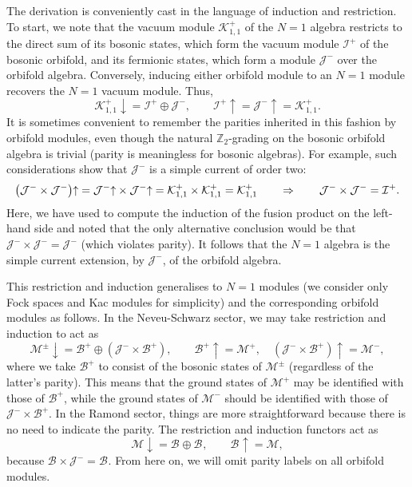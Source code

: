 \documentclass[a4paper,reqno,12pt]{report}
\theoremstyle{definition}
\numberwithin{equation}{section}
\let\originalleft\left     %
\let\originalright\right
\renewcommand{\left}{\mathopen{}\mathclose\bgroup\originalleft}
\renewcommand{\right}{\aftergroup\egroup\originalright}
\newcommand{\brac}[1]{\left( #1 \right)}
\newcommand{\ZZ}{\mathbb{Z}}
\newcommand{\Ra}{\Rightarrow}
\newcommand{\Kac}[1]{\mathcal{K}_{#1}}       %
\newcommand{\fuse}{\mathbin{\times}}                                            %
\newcommand{\lhs}{left-hand side}
\newcommand{\ns}{Neveu-Schwarz}
\theoremstyle{plain}
\newcommand{\Mod}[1]{\mathcal{#1}}                 %
\newcommand{\Res}[1]{#1 {\downarrow}} %
\newcommand{\Ind}[1]{#1 {\uparrow}}   %
\newcommand{\Orb}[1]{\Mod{B}_{#1}}                 %
\begin{document}
The derivation is conveniently cast in the language of induction and restriction.  To start, we note that the vacuum module $\Kac{1,1}^+$ of the $N=1$ algebra restricts to the direct sum of its bosonic states, which form the vacuum module $\Mod{I}^+$ of the bosonic orbifold, and its fermionic states, which form a module $\Mod{J}^-$ over the orbifold algebra.  Conversely, inducing either orbifold module to an $N=1$ module recovers the $N=1$ vacuum module.  Thus,
\begin{equation} \label{eq:ResVacMod}
\Res{\Kac{1,1}^+} = \Mod{I}^+ \oplus \Mod{J}^-, \qquad \Ind{\Mod{I}^+} = \Ind{\Mod{J}^-} = \Kac{1,1}^+.
\end{equation}
It is sometimes convenient to remember the parities inherited in this fashion by orbifold modules, even though the natural $\ZZ_2$-grading on the bosonic orbifold algebra is trivial (parity is meaningless for bosonic algebras).  For example, such considerations show that $\Mod{J}^-$ is a simple current of order two:
\begin{equation}
\Ind{\brac{\Mod{J}^- \fuse \Mod{J}^-}} = \Ind{\Mod{J}^-} \fuse \Ind{\Mod{J}^-} = \Kac{1,1}^+ \fuse \Kac{1,1}^+ = \Kac{1,1}^+ \qquad \Ra \qquad \Mod{J}^- \fuse \Mod{J}^- = \Mod{I}^+.
\end{equation}
Here, we have used \cite[Eq.~(3.3)]{RidVer14} to compute the induction of the fusion product on the \lhs{} and noted that the only alternative conclusion would be that $\Mod{J}^- \fuse \Mod{J}^- = \Mod{J}^-$ (which violates parity).  It follows that the $N=1$ algebra is the simple current extension, by $\Mod{J}^-$, of the orbifold algebra.

This restriction and induction generalises to $N=1$ modules (we consider only Fock spaces and Kac modules for simplicity) and the corresponding orbifold modules as follows.  In the \ns{} sector, we may take restriction and induction to act as
\begin{equation} \label{eq:IndResNS}
\Res{\Mod{M}^{\pm}} = \Orb{}^+ \oplus (\Mod{J}^- \times \Orb{}^+), \qquad \Ind{\Orb{}^+} = \Mod{M}^+, \quad \Ind{(\Mod{J}^- \times \Orb{}^+)} = \Mod{M}^-,
\end{equation}
where we take $\Orb{}^+$ to consist of the bosonic states of $\Mod{M}^{\pm}$ (regardless of the latter's parity).  This means that the ground states of $\Mod{M}^+$ may be identified with those of $\Orb{}^+$, while the ground states of $\Mod{M}^-$ should be identified with those of $\Mod{J}^- \times \Orb{}^+$.  In the Ramond sector, things are more straightforward because there is no need to indicate the parity.  The restriction and induction functors act as
\begin{equation} \label{eq:IndResR}
\Res{\Mod{M}} = \Orb{} \oplus \Orb{}, \qquad \Ind{\Orb{}} = \Mod{M},
\end{equation}
because $\Orb{} \fuse \Mod{J}^- = \Orb{}$.  From here on, we will omit parity labels on all orbifold modules.
\end{document}
